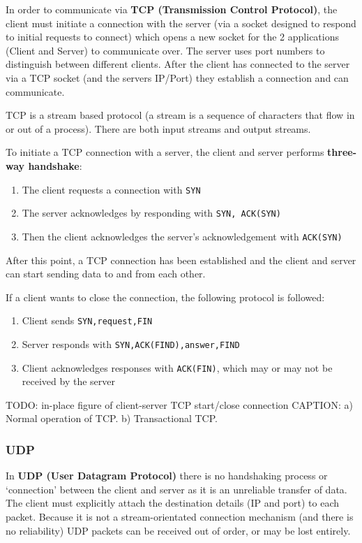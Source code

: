 \documentclass{article}
\begin{document}
In order to communicate via \textbf{TCP (Transmission Control Protocol)}, the client must initiate a connection with the server (via a socket designed to respond to initial requests to connect) which opens a new socket for the 2 applications (Client and Server) to communicate over. The server uses port numbers to distinguish between different clients. After the client has connected to the server via a TCP socket (and the servers IP/Port) they establish a connection and can communicate.

TCP is a stream based protocol (a stream is a sequence of characters that flow in or out of a process). There are both input streams and output streams.

To initiate a TCP connection with a server, the client and server performs \textbf{three-way handshake}:
\begin{enumerate}
	\item The client requests a connection with \texttt{SYN}
	\item The server acknowledges by responding with \texttt{SYN, ACK(SYN)}
	\item Then the client acknowledges the server's acknowledgement with \texttt{ACK(SYN)}
\end{enumerate}
After this point, a TCP connection has been established and the client and server can start sending data to and from each other.

If a client wants to close the connection, the following protocol is followed:
\begin{enumerate}
	\item Client sends \texttt{SYN,request,FIN}
	\item Server responds with \texttt{SYN,ACK(FIND),answer,FIND}
	\item Client acknowledges responses with \texttt{ACK(FIN)}, which may or may not be received by the server
\end{enumerate}

TODO: in-place figure of client-server TCP start/close connection
CAPTION: a) Normal operation of TCP. 
b) Transactional TCP.

\subsubsection{UDP}

In \textbf{UDP (User Datagram Protocol)} there is no handshaking process or `connection' between the client and server as it is an unreliable transfer of data. The client must explicitly attach the destination details (IP and port) to each packet. Because it is not a stream-orientated connection mechanism (and there is no reliability) UDP packets can be received out of order, or may be lost entirely.
\end{document}
